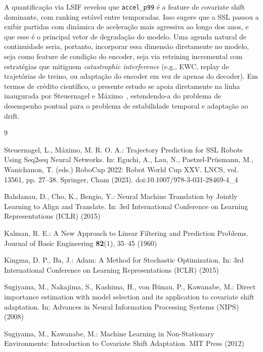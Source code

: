 \documentclass[runningheads]{llncs}
\begin{document}
A quantifica\c{c}\~ao via LSIF revelou que \texttt{accel\_p99} \'e a feature de covariate shift dominante, com ranking est\'avel entre temporadas. Isso sugere que a SSL passou a exibir partidas com din\^amica de acelera\c{c}\~ao mais agressiva ao longo dos anos, e que esse \'e o principal vetor de degrada\c{c}\~ao do modelo. Uma agenda natural de continuidade seria, portanto, incorporar essa dimens\~ao diretamente no modelo, seja como feature de condi\c{c}\~ao do encoder, seja via retrining incremental com estrat\'egias que mitiguem \emph{catastrophic interference} (e.g., EWC, replay de trajet\'orias de treino, ou adapta\c{c}\~ao do encoder em vez de apenas do decoder). Em termos de cr\'edito cient\'ifico, o presente estudo se apoia diretamente na linha inaugurada por Steuernagel e M\'aximo~\cite{seq2seq}, estendendo-a do problema de desempenho pontual para o problema de estabilidade temporal e adapta\c{c}\~ao ao drift.

\begin{thebibliography}{9}

Steuernagel, L., M\'aximo, M. R. O. A.: Trajectory Prediction for SSL Robots Using Seq2seq Neural Networks. In: Eguchi, A., Lau, N., Paetzel-Pr\"usmann, M., Wanichanon, T. (eds.) RoboCup 2022: Robot World Cup XXV. LNCS, vol. 13561, pp. 27--38. Springer, Cham (2023). doi:10.1007/978-3-031-28469-4\_4

Bahdanau, D., Cho, K., Bengio, Y.: Neural Machine Translation by Jointly Learning to Align and Translate. In: 3rd International Conference on Learning Representations (ICLR) (2015)

Kalman, R. E.: A New Approach to Linear Filtering and Prediction Problems. Journal of Basic Engineering \textbf{82}(1), 35--45 (1960)

Kingma, D. P., Ba, J.: Adam: A Method for Stochastic Optimization. In: 3rd International Conference on Learning Representations (ICLR) (2015)

Sugiyama, M., Nakajima, S., Kashima, H., von B\"unau, P., Kawanabe, M.: Direct importance estimation with model selection and its application to covariate shift adaptation. In: Advances in Neural Information Processing Systems (NIPS) (2008)

Sugiyama, M., Kawanabe, M.: Machine Learning in Non-Stationary Environments: Introduction to Covariate Shift Adaptation. MIT Press (2012)

\end{thebibliography}
\end{document}
